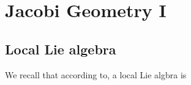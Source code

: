 % 
\newpage
{}
\section{Jacobi Geometry I} %
\label{sec:jacobi_geometry_i}

\subsection{Local Lie algebra} %
\label{sub:local_lie_algebra}
We recall that according to, a local Lie algbra is 
